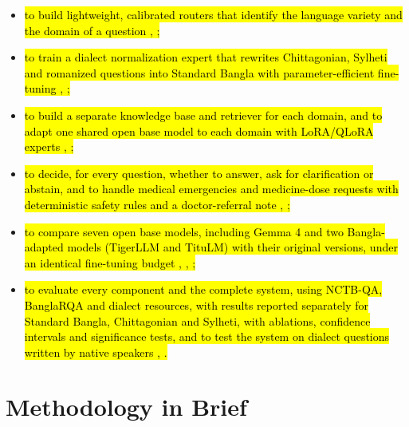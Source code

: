 \begin{itemize}
\item \hl{to build lightweight, calibrated routers that identify the
language variety and the domain of a question \cite{faria2023vashantor}, \cite{bhattacharjee2022banglabert};}

\item \hl{to train a dialect normalization expert that rewrites
Chittagonian, Sylheti and romanized questions into Standard Bangla with
parameter-efficient fine-tuning \cite{jawad2026fivedialects}, \cite{hu2022lora};}

\item \hl{to build a separate knowledge base and retriever for each domain,
and to adapt one shared open base model to each domain with LoRA/QLoRA
experts \cite{lewis2020rag}, \cite{dettmers2023qlora};}

\item \hl{to decide, for every question, whether to answer, ask for
clarification or abstain, and to handle medical emergencies and
medicine-dose requests with deterministic safety rules and a
doctor-referral note \cite{rajpurkar2018squad2}, \cite{kamath2020selective};}

\item \hl{to compare seven open base models, including Gemma 4 and two
Bangla-adapted models (TigerLLM and TituLM) with their original
versions, under an identical fine-tuning budget \cite{raihan2025tigerllm}, \cite{titulm2025},
\cite{gemma4};}

\item \hl{to evaluate every component and the complete system, using
NCTB-QA, BanglaRQA and dialect resources, with results reported
separately for Standard Bangla, Chittagonian and Sylheti, with
ablations, confidence intervals and significance tests, and to test the
system on dialect questions written by native speakers \cite{nctbqa},
\cite{ekram2022banglarqa}.}
\end{itemize}

\section{Methodology in Brief}\label{methodology-in-brief}

